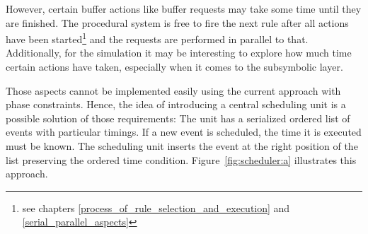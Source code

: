 However, certain buffer actions like buffer requests may take some time until they are finished. The procedural system is free to fire the next rule after all actions have been started\footnote{see chapters \ref{process_of_rule_selection_and_execution} and \ref{serial_parallel_aspects}} and the requests are performed in parallel to that. Additionally, for the simulation it may be interesting to explore how much time certain actions have taken, especially when it comes to the subsymbolic layer.

Those aspects cannot be implemented easily using the current approach with phase constraints. Hence, the idea of introducing a central scheduling unit is a possible solution of those requirements: The unit has a serialized ordered list of events with particular timings. If a new event is scheduled, the time it is executed must be known. The scheduling unit inserts the event at the right position of the list preserving the ordered time condition. Figure~\ref{fig:scheduler:a} illustrates this approach.

